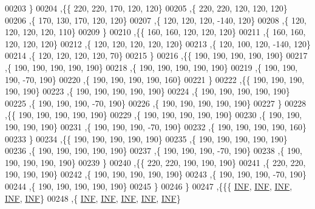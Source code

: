 \begin{DoxyCode}
00203   \}
00204  ,\{\{   220,   220,   170,   120,   120\}
00205   ,\{   220,   220,   120,   120,   120\}
00206   ,\{   170,   130,   170,   120,   120\}
00207   ,\{   120,   120,   120,  -140,   120\}
00208   ,\{   120,   120,   120,   120,   110\}
00209   \}
00210  ,\{\{   160,   160,   120,   120,   120\}
00211   ,\{   160,   160,   120,   120,   120\}
00212   ,\{   120,   120,   120,   120,   120\}
00213   ,\{   120,   100,   120,  -140,   120\}
00214   ,\{   120,   120,   120,   120,    70\}
00215   \}
00216  ,\{\{   190,   190,   190,   190,   190\}
00217   ,\{   190,   190,   190,   190,   190\}
00218   ,\{   190,   190,   190,   190,   190\}
00219   ,\{   190,   190,   190,   -70,   190\}
00220   ,\{   190,   190,   190,   190,   160\}
00221   \}
00222  ,\{\{   190,   190,   190,   190,   190\}
00223   ,\{   190,   190,   190,   190,   190\}
00224   ,\{   190,   190,   190,   190,   190\}
00225   ,\{   190,   190,   190,   -70,   190\}
00226   ,\{   190,   190,   190,   190,   190\}
00227   \}
00228  ,\{\{   190,   190,   190,   190,   190\}
00229   ,\{   190,   190,   190,   190,   190\}
00230   ,\{   190,   190,   190,   190,   190\}
00231   ,\{   190,   190,   190,   -70,   190\}
00232   ,\{   190,   190,   190,   190,   160\}
00233   \}
00234  ,\{\{   190,   190,   190,   190,   190\}
00235   ,\{   190,   190,   190,   190,   190\}
00236   ,\{   190,   190,   190,   190,   190\}
00237   ,\{   190,   190,   190,   -70,   190\}
00238   ,\{   190,   190,   190,   190,   190\}
00239   \}
00240  ,\{\{   220,   220,   190,   190,   190\}
00241   ,\{   220,   220,   190,   190,   190\}
00242   ,\{   190,   190,   190,   190,   190\}
00243   ,\{   190,   190,   190,   -70,   190\}
00244   ,\{   190,   190,   190,   190,   190\}
00245   \}
00246  \}
00247 ,\{\{\{   \mbox{\hyperlink{1_88_84__epars_8h_a12c2040f25d8e3a7b9e1c2024c618cb6}{INF}},   \mbox{\hyperlink{1_88_84__epars_8h_a12c2040f25d8e3a7b9e1c2024c618cb6}{INF}},   \mbox{\hyperlink{1_88_84__epars_8h_a12c2040f25d8e3a7b9e1c2024c618cb6}{INF}},   \mbox{\hyperlink{1_88_84__epars_8h_a12c2040f25d8e3a7b9e1c2024c618cb6}{INF}},   \mbox{\hyperlink{1_88_84__epars_8h_a12c2040f25d8e3a7b9e1c2024c618cb6}{INF}}\}
00248   ,\{   \mbox{\hyperlink{1_88_84__epars_8h_a12c2040f25d8e3a7b9e1c2024c618cb6}{INF}},   \mbox{\hyperlink{1_88_84__epars_8h_a12c2040f25d8e3a7b9e1c2024c618cb6}{INF}},   \mbox{\hyperlink{1_88_84__epars_8h_a12c2040f25d8e3a7b9e1c2024c618cb6}{INF}},   \mbox{\hyperlink{1_88_84__epars_8h_a12c2040f25d8e3a7b9e1c2024c618cb6}{INF}},   \mbox{\hyperlink{1_88_84__epars_8h_a12c2040f25d8e3a7b9e1c2024c618cb6}{INF}}\}

\end{DoxyCode}

